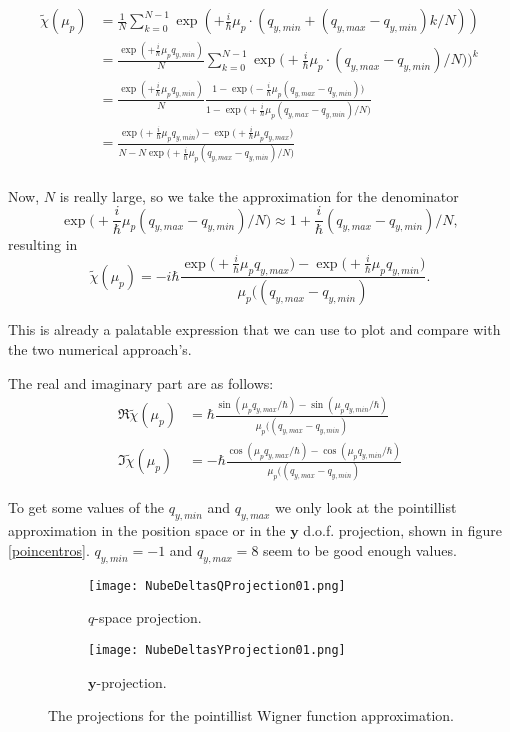 \documentclass[a4paper,12pt]{article}
\newcommand{\ihb}{\frac{i}{\hbar}}
\newcommand{\yfase}{\mathbf{y}}
\begin{document}
\begin{align}\label{aprox01}
\tilde{\chi}(\mu_p)  & = 
\frac{1}{N}\sum_{k=0}^{N-1} \exp(+\ihb \mu_p \cdot (q_{y,min}+(q_{y,max}-q_{y,min})k/N)) \\
& = 
\frac{ \exp(+\ihb \mu_p  q_{y,min})}{N}\sum_{k=0}^{N-1} 
\exp\big(+\ihb \mu_p \cdot (q_{y,max}-q_{y,min})/N)\big)^k   \\
& = \frac{\exp(+\ihb \mu_p  q_{y,min})}{N} 
\frac{ 1 - \exp\big(-\ihb \mu_p (q_{y,max}- q_{y,min})\big)}
{ 1 - \exp\big(+\ihb \mu_p (q_{y,max}- q_{y,min})/N\big)} \\
& =\frac{\exp\big(+\ihb \mu_p q_{y,min}\big) - \exp\big(+\ihb \mu_p q_{y,max}\big)}
{ N - N \exp\big(+\ihb \mu_p (q_{y,max}- q_{y,min})/N\big)} \\
\end{align}

Now, $N$ is really large, so we take the approximation for
the denominator
\begin{equation}
\exp\big(+\ihb \mu_p (q_{y,max}- q_{y,min})/N\big) \approx
1 + \ihb  (q_{y,max}- q_{y,min})/N,
\end{equation}
resulting in 
\begin{equation}
\tilde{\chi}(\mu_p)  = -i\hbar
\frac{\exp\big(+\ihb \mu_p q_{y,max}\big) - \exp\big(+\ihb \mu_p q_{y,min}\big)}
{\mu_p ( (q_{y,max}- q_{y,min})}.
\end{equation}

This is already a palatable expression that we can use to plot and compare with 
the two numerical approach's. 

The real and imaginary part are as follows:
\begin{align}
\Re \tilde{\chi} (\mu_p)  &= \hbar
\frac{\sin(\mu_p q_{y,max} /\hbar)-\sin(\mu_p q_{y,min} /\hbar)}
{\mu_p ( (q_{y,max}- q_{y,min})} \\
\Im \tilde{\chi} (\mu_p)  &= -\hbar
\frac{\cos(\mu_p q_{y,max} /\hbar)-\cos(\mu_p q_{y,min} /\hbar)}
{\mu_p ( (q_{y,max}- q_{y,min})} 
\end{align}

To get some values of the $q_{y,min}$ and $q_{y,max}$ we only look
at the pointillist approximation in the position space
 or in the $\yfase$ d.o.f. projection, shown in figure \ref{poincentros}.
$q_{y,min}=-1$ and $q_{y,max}=8$ seem to be good enough values.

\begin{figure}[h]
 \centering
  \begin{subfigure}[b]{0.45\textwidth}
    \centering
          \texttt{[image: NubeDeltasQProjection01.png]}
                \caption{$q$-space projection.}
                \label{NubeQ}
  \end{subfigure}%
\begin{subfigure}[b]{0.45\textwidth}
    \centering
          \texttt{[image: NubeDeltasYProjection01.png]}
                \caption{$\yfase$-projection.}
                \label{NubeY}
  \end{subfigure}%
\caption{The projections for the pointillist Wigner function approximation. }\label{poincentros}\label{nubes}
\end{figure}
\end{document}
